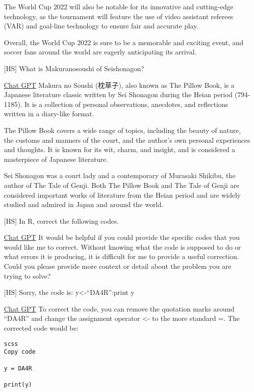 \documentclass[
]{book}
\theoremstyle{definition}
\theoremstyle{definition}
\theoremstyle{definition}
\theoremstyle{definition}
\theoremstyle{remark}
\begin{document}
The World Cup 2022 will also be notable for its innovative and cutting-edge technology, as the tournament will feature the use of video assistant referees (VAR) and goal-line technology to ensure fair and accurate play.

Overall, the World Cup 2022 is sure to be a memorable and exciting event, and soccer fans around the world are eagerly anticipating its arrival.

{[}HS{]} What is Makuranosoushi of Seishonagon?

\protect\hyperlink{chatgpt}{Chat GPT} Makura no Soushi (枕草子), also known as The Pillow Book, is a Japanese literature classic written by Sei Shonagon during the Heian period (794-1185). It is a collection of personal observations, anecdotes, and reflections written in a diary-like format.

The Pillow Book covers a wide range of topics, including the beauty of nature, the customs and manners of the court, and the author's own personal experiences and thoughts. It is known for its wit, charm, and insight, and is considered a masterpiece of Japanese literature.

Sei Shonagon was a court lady and a contemporary of Murasaki Shikibu, the author of The Tale of Genji. Both The Pillow Book and The Tale of Genji are considered important works of literature from the Heian period and are widely studied and admired in Japan and around the world.

{[}HS{]} In R, correct the following codes.

\protect\hyperlink{chatgpt}{Chat GPT} It would be helpful if you could provide the specific codes that you would like me to correct. Without knowing what the code is supposed to do or what errors it is producing, it is difficult for me to provide a useful correction. Could you please provide more context or detail about the problem you are trying to solve?

{[}HS{]} Sorry, the code is: y\textless-``DA4R'':print y

\protect\hyperlink{chatgpt}{Chat GPT} To correct the code, you can remove the quotation marks around ``DA4R'' and change the assignment operator \textless- to the more standard =. The corrected code would be:

\begin{verbatim}
scss
Copy code

y = DA4R

print(y)
\end{verbatim}
\end{document}

